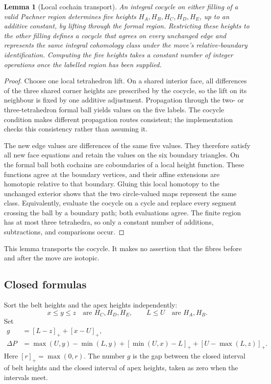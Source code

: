 \documentclass[11pt,letterpaper]{article}
\newtheorem{lemma}[theorem]{Lemma}
\theoremstyle{definition}
\theoremstyle{remark}
\newcommand{\pos}[1]{\left[#1\right]_{+}}
\begin{document}
\begin{lemma}[Local cochain transport]
\label{lem:transport}
An integral cocycle on either filling of a valid Pachner region determines
five heights $H_A,H_B,H_C,H_D,H_E$, up to an additive constant, by lifting
through the formal region. Restricting these heights to the other filling
defines a cocycle that agrees on every unchanged edge and represents the
same integral cohomology class under the move's relative-boundary
identification. Computing the five heights takes a constant number of
integer operations once the labelled region has been supplied.
\end{lemma}
\begin{proof}
Choose one local tetrahedron lift. On a shared interior face, all differences
of the three shared corner heights are prescribed by the cocycle, so the
lift on its neighbour is fixed by one additive adjustment. Propagation
through the two- or three-tetrahedron formal ball yields values on the five
labels. The cocycle condition makes different propagation routes consistent;
the implementation checks this consistency rather than assuming it.

The new edge values are differences of the same five values. They therefore
satisfy all new face equations and retain the values on the six boundary
triangles. On the formal ball both cochains are coboundaries of a local
height function. These functions agree at the boundary vertices, and their
affine extensions are homotopic relative to that boundary. Gluing this
local homotopy to the unchanged exterior shows that the two circle-valued
maps represent the same class. Equivalently, evaluate the cocycle on a
cycle and replace every segment crossing the ball by a boundary path;
both evaluations agree. The finite region has at most three tetrahedra,
so only a constant number of additions, subtractions, and comparisons occur.
\end{proof}

This lemma transports the cocycle. It makes no assertion that the fibres
before and after the move are isotopic.

\subsection{Closed formulas}

Sort the belt heights and the apex heights independently:
\[
 x\le y\le z\quad\text{are }H_C,H_D,H_E,
 \qquad L\le U\quad\text{are }H_A,H_B.
\]
Set
\begin{align}
 g&=\pos{L-z}+\pos{x-U},\label{eq:gap}\\
 \Delta P
 &=\max(U,y)-\min(L,y)
   +\pos{\min(U,x)-L}+\pos{U-\max(L,z)}.
 \label{eq:pieces}
\end{align}
Here $[r]_+=\max(0,r)$. The number $g$ is the gap between the closed
interval of belt heights and the closed interval of apex heights, taken
as zero when the intervals meet.
\end{document}
